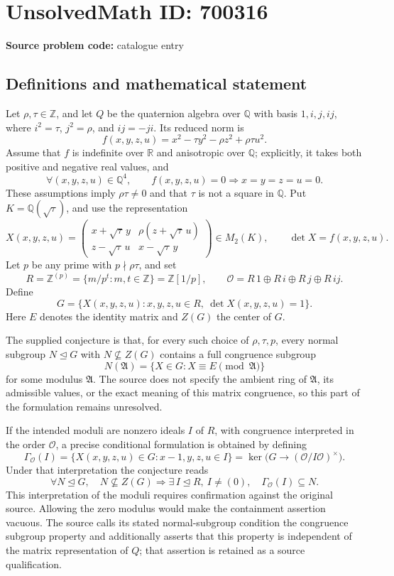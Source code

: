 \documentclass[11pt]{article}
\newcommand{\Z}{\mathbb{Z}}
\newcommand{\Q}{\mathbb{Q}}
\newcommand{\R}{\mathbb{R}}
\begin{document}
\section*{UnsolvedMath ID: 700316}
\textbf{Source problem code:} catalogue entry
\subsection{Definitions and mathematical statement}
Let \(\rho,\tau\in\Z\), and let \(Q\) be the quaternion algebra over \(\Q\) with basis \(1,i,j,ij\), where \(i^2=\tau\), \(j^2=\rho\), and \(ij=-ji\). Its reduced norm is
\[
f(x,y,z,u)=x^2-\tau y^2-\rho z^2+\rho\tau u^2.
\]
Assume that \(f\) is indefinite over \(\R\) and anisotropic over \(\Q\); explicitly, it takes both positive and negative real values, and
\[
\forall(x,y,z,u)\in\Q^4,\qquad f(x,y,z,u)=0\Longrightarrow x=y=z=u=0.
\]
These assumptions imply \(\rho\tau\ne0\) and that \(\tau\) is not a square in \(\Q\). Put \(K=\Q(\sqrt{\tau})\), and use the representation
\[
X(x,y,z,u)=\begin{pmatrix}
x+\sqrt{\tau}\,y&\rho(z+\sqrt{\tau}\,u)\\
z-\sqrt{\tau}\,u&x-\sqrt{\tau}\,y
\end{pmatrix}\in M_2(K),
\qquad \det X=f(x,y,z,u).
\]
Let \(p\) be any prime with \(p\nmid\rho\tau\), and set
\[
R=\Z^{(p)}=\{m/p^t:m,t\in\Z\}=\Z[1/p],\qquad
\mathcal O=R\,1\oplus R\,i\oplus R\,j\oplus R\,ij.
\]
Define
\[
G=\{X(x,y,z,u):x,y,z,u\in R,\ \det X(x,y,z,u)=1\}.
\]
Here \(E\) denotes the identity matrix and \(Z(G)\) the center of \(G\).

The supplied conjecture is that, for every such choice of \(\rho,\tau,p\), every normal subgroup \(N\trianglelefteq G\) with \(N\not\subseteq Z(G)\) contains a full congruence subgroup
\[
N(\mathfrak A)=\{X\in G:X\equiv E\pmod{\mathfrak A}\}
\]
for some modulus \(\mathfrak A\). The source does not specify the ambient ring of \(\mathfrak A\), its admissible values, or the exact meaning of this matrix congruence, so this part of the formulation remains unresolved.

If the intended moduli are nonzero ideals \(I\) of \(R\), with congruence interpreted in the order \(\mathcal O\), a precise conditional formulation is obtained by defining
\[
\Gamma_{\mathcal O}(I)=\{X(x,y,z,u)\in G:x-1,y,z,u\in I\}
=\ker\bigl(G\longrightarrow(\mathcal O/I\mathcal O)^\times\bigr).
\]
Under that interpretation the conjecture reads
\[
\forall N\trianglelefteq G,\quad
N\not\subseteq Z(G)\Longrightarrow
\exists\,I\trianglelefteq R,\ I\ne(0),\quad
\Gamma_{\mathcal O}(I)\subseteq N.
\]
This interpretation of the moduli requires confirmation against the original source. Allowing the zero modulus would make the containment assertion vacuous. The source calls its stated normal-subgroup condition the congruence subgroup property and additionally asserts that this property is independent of the matrix representation of \(Q\); that assertion is retained as a source qualification.
\end{document}
